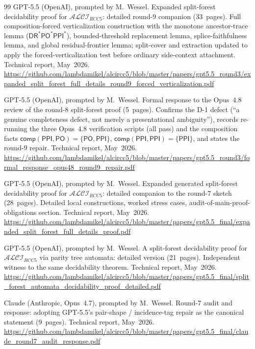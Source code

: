 \documentclass[
]{ceurart}
\theoremstyle{definition}
\newcommand{\ALCIRCC}[1]{\ensuremath{\mathcal{ALCI}_{\mathit{RCC#1}}}}
\newcommand{\DR}{\ensuremath{\mathsf{DR}}}
\newcommand{\PO}{\ensuremath{\mathsf{PO}}}
\newcommand{\PPI}{\ensuremath{\mathsf{PPI}}}
\newcommand{\comp}{\ensuremath{\mathsf{comp}}}
\begin{document}
\begin{thebibliography}{99}
GPT-5.5 (OpenAI), prompted by M.\ Wessel.
\newblock Expanded split-forest decidability proof for
  $\ALCIRCC{5}$: detailed round-9 companion (33~pages).  Full
  composition-forced verticalization construction with the
  monotone ancestor-trace lemma ($\DR^*\PO^*\PPI^*$), bounded-threshold
  replacement lemma, splice-faithfulness lemma, and global
  residual-frontier lemma; split-cover and extraction updated to
  apply the forced-verticalization test before ordinary
  side-context attachment.
\newblock Technical report, May~2026.
\newblock \url{https://github.com/lambdamikel/alcircc5/blob/master/papers/gpt5.5_round3/expanded_split_forest_full_details_round9_forced_verticalization.pdf}

GPT-5.5 (OpenAI), prompted by M.\ Wessel.
\newblock Formal response to the Opus~4.8 review of the round-8
  split-forest proof (5~pages).  Confirms the D-1 defect (``a genuine
  completeness defect, not merely a presentational ambiguity''),
  records re-running the three Opus~4.8 verification scripts (all
  pass) and the composition facts $\comp(\PPI,\PO)=\{\PO,\PPI\}$,
  $\comp(\PPI,\PPI)=\{\PPI\}$, and states the round-9 repair.
\newblock Technical report, May~2026.
\newblock \url{https://github.com/lambdamikel/alcircc5/blob/master/papers/gpt5.5_round3/formal_response_opus48_round9_repair.pdf}

GPT-5.5 (OpenAI), prompted by M.\ Wessel.
\newblock Expanded generated split-forest decidability proof for
  $\ALCIRCC{5}$: detailed companion to the round-7 sketch
  (28~pages).  Detailed local constructions, worked stress cases,
  audit-of-main-proof-obligations section.
\newblock Technical report, May~2026.
\newblock \url{https://github.com/lambdamikel/alcircc5/blob/master/papers/gpt5.5_final/expanded_split_forest_full_details_proof.pdf}

GPT-5.5 (OpenAI), prompted by M.\ Wessel.
\newblock A split-forest decidability proof for $\ALCIRCC{5}$ via
  parity tree automata: detailed version (21~pages).  Independent
  witness to the same decidability theorem.
\newblock Technical report, May~2026.
\newblock \url{https://github.com/lambdamikel/alcircc5/blob/master/papers/gpt5.5_final/split_forest_automata_decidability_proof_detailed.pdf}

Claude (Anthropic, Opus~4.7), prompted by M.\ Wessel.
\newblock Round-7 audit and response: adopting GPT-5.5's
  pair-shape / incidence-tag repair as the canonical statement
  (9~pages).
\newblock Technical report, May~2026.
\newblock \url{https://github.com/lambdamikel/alcircc5/blob/master/papers/gpt5.5_final/claude_round7_audit_response.pdf}


\end{thebibliography}
\end{document}
